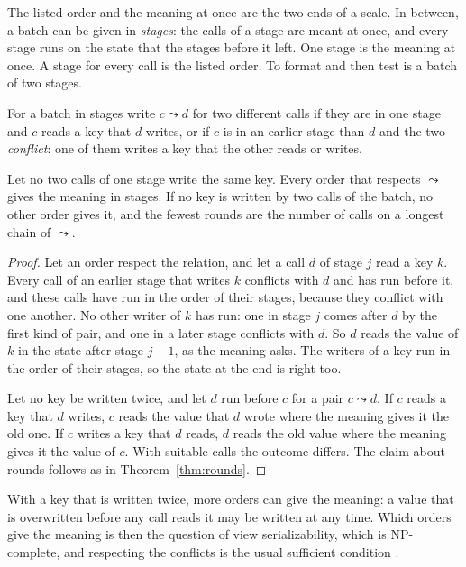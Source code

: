 \documentclass[acmsmall,nonacm,screen]{acmart}
\begin{document}
The listed order and the meaning at once are the two ends of a scale. In between, a batch
can be given in \emph{stages}: the calls of a stage are meant at once, and every stage runs
on the state that the stages before it left. One stage is the meaning at once. A stage for
every call is the listed order. To format and then test is a batch of two stages.

For a batch in stages write $c \leadsto d$ for two different calls if they are in one stage
and $c$ reads a key that $d$ writes, or if $c$ is in an earlier stage than $d$ and the two
\emph{conflict}: one of them writes a key that the other reads or writes.

\begin{theorem}[Stages]\label{thm:stages}
Let no two calls of one stage write the same key. Every order that respects $\leadsto$ gives
the meaning in stages. If no key is written by two calls of the batch, no other order gives
it, and the fewest rounds are the number of calls on a longest chain of $\leadsto$.
\end{theorem}

\begin{proof}
Let an order respect the relation, and let a call $d$ of stage $j$ read a key $k$. Every
call of an earlier stage that writes $k$ conflicts with $d$ and has run before it, and these
calls have run in the order of their stages, because they conflict with one another. No
other writer of $k$ has run: one in stage $j$ comes after $d$ by the first kind of pair, and
one in a later stage conflicts with $d$. So $d$ reads the value of $k$ in the state after
stage $j - 1$, as the meaning asks. The writers of a key run in the order of their stages,
so the state at the end is right too.

Let no key be written twice, and let $d$ run before $c$ for a pair $c \leadsto d$. If $c$
reads a key that $d$ writes, $c$ reads the value that $d$ wrote where the meaning gives it
the old one. If $c$ writes a key that $d$ reads, $d$ reads the old value where the meaning
gives it the value of $c$. With suitable calls the outcome differs. The claim about rounds
follows as in Theorem~\ref{thm:rounds}.
\end{proof}

With a key that is written twice, more orders can give the meaning: a value that is
overwritten before any call reads it may be written at any time. Which orders give the
meaning is then the question of view serializability, which is NP-complete, and respecting
the conflicts is the usual sufficient condition \citep{Papadimitriou1979}.
\end{document}
